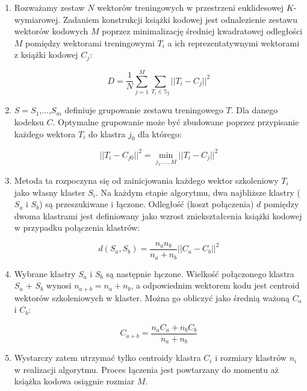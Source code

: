 \documentclass{article}
\begin{document}
\begin{enumerate}
 \item Rozważamy zestaw $N$ wektorów treningowych w przestrzeni euklidesowej $K$-wymiarowej. 
   Zadaniem konstrukcji książki kodowej jest odnalezienie zestawu wektorów kodowych $M$ poprzez minimalizację 
   średniej kwadratowej odległości $M$ pomiędzy wektorami treningowymi $T_{i}$ a ich reprezentatywnymi wektorami z książki kodowej $C_{j}$:

\begin{equation}
D = \frac{1}{N} \sum_{j=1}^M \sum_{T_{i}\in\mathbb{S_{j}}} ||T_{i} - C_{j}||^2
\end{equation}

\item $S=S_{1}$,...,$S_{m}$ definiuje grupowanie zestawu treningowego $T$. 
  Dla danego kodeksu $C$. 
  Optymalne grupowanie może być zbudowane poprzez przypisanie każdego wektora $T_{i}$ do klastra $j_{0}$ dla którego:

\begin{equation}
||T_{i} - C_{j0}||^2 = \displaystyle \min_{j_1,\dots ,M} ||T_{i} - C_{j}||^2
\end{equation}

\item Metoda ta rozpoczyna się od zainicjowania każdego wektor szkoleniowy $T_{i}$ jako własny klaster $S_{i}$. 
  Na każdym etapie algorytmu, dwa najbliższe klastry ($S_{a}$ i $S_{b}$) są przeszukiwane i łączone. 
  Odległość (koszt połączenia) $d$ pomiędzy dwoma klastrami jest definiowany jako wzrost zniekształcenia książki kodowej w przypadku połączenia klastrów:

\begin{equation}
d(S_{a}, S_{b}) = \frac{n_{a}n_{b}}{n_{a} + n_{b}} || C_{a} - C_{b} ||^2
\end{equation}

\item Wybrane klastry $S_{a}$ i $S_{b}$ są następnie łączone. Wielkość połączonego klastra $S_{a}$ + $S_{b}$ wynosi $n_{a+b} = n_{a} + n_{b}$, 
  a odpowiednim wektorem kodu jest centroid wektorów szkoleniowych w klaster. Można go obliczyć jako średnią ważoną $C_{a}$ i $C_{b}$:

\begin{equation}
C_{a + b} = \frac{n_{a}C_{a} + n_{b}C_{b}}{n_{a} + n_{b}}
\end{equation}

\item Wystarczy zatem utrzymać tylko centroidy klastra $C_{i}$ i rozmiary klastrów $n_{i}$ w realizacji algorytmu. 
  Proces łączenia jest powtarzany do momentu aż książka kodowa osiągnie rozmiar $M$. 

\end{enumerate}
\end{document}
